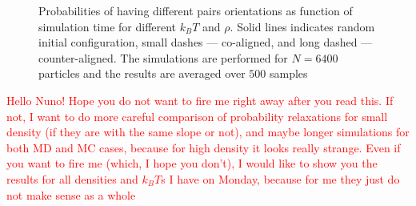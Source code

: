 \begin{figure}[h]
\begin{subfigure}[t]{0.45\textwidth}
	\captionsetup{justification=centering, width=0.9\columnwidth}
\end{subfigure}
\captionsetup{justification=centering, width=0.9\columnwidth}
\caption{Probabilities of having different pairs orientations as function of simulation time for different $k_BT$ and $\rho$. Solid lines indicates random initial configuration, small dashes --- co-aligned, and long dashed --- counter-aligned. The simulations are performed for $N = 6400$ particles and the results are averaged over $500$ samples}
\label{fig:short_time_probs_different_density}
\end{figure}

\textcolor{red}{Hello Nuno! Hope you do not want to fire me right away after you read this. If not, I want to do more careful comparison of probability relaxations for small density (if they are with the same slope or not), and maybe longer simulations for both MD and MC cases, because for high density it looks really strange. Even if you want to fire me (which, I hope you don't), I would like to show you the results for all densities and $k_BT$s I have on Monday, because for me they just do not make sense as a whole}